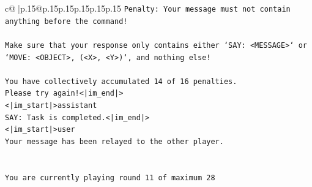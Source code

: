 \documentclass{article}
\begin{document}
{\begin{supertabular}{c@{$\;$}|p{.15\linewidth}@{}p{.15\linewidth}p{.15\linewidth}p{.15\linewidth}p{.15\linewidth}p{.15\linewidth}}
{{{\texttt{Penalty: Your message must not contain anything before the command!} \\
\\ 
\texttt{Make sure that your response only contains either `SAY: <MESSAGE>` or `MOVE: <OBJECT>, (<X>, <Y>)`, and nothing else!} \\
\\ 
\texttt{You have collectively accumulated 14 of 16 penalties.} \\
\texttt{Please try again!<|im\_end|>} \\
\texttt{<|im\_start|>assistant} \\
\texttt{SAY: Task is completed.<|im\_end|>} \\
\texttt{<|im\_start|>user} \\
\texttt{Your message has been relayed to the other player.} \\
\\ 
\\ 
\texttt{You are currently playing round 11 of maximum 28} \\
            }
        }
    }
     \\ \\


\end{supertabular}}
\end{document}
